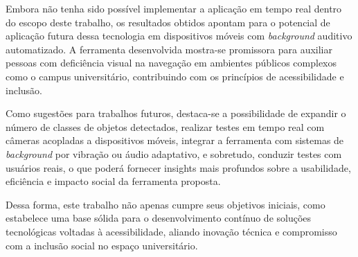 Embora não tenha sido possível implementar a aplicação em tempo real dentro do escopo deste trabalho, os resultados obtidos apontam para o potencial de aplicação futura dessa tecnologia em dispositivos móveis com \textit{background} auditivo automatizado. A ferramenta desenvolvida mostra-se promissora para auxiliar pessoas com deficiência visual na navegação em ambientes públicos complexos como o campus universitário, contribuindo com os princípios de acessibilidade e inclusão.

Como sugestões para trabalhos futuros, destaca-se a possibilidade de expandir o número de classes de objetos detectados, realizar testes em tempo real com câmeras acopladas a dispositivos móveis, integrar a ferramenta com sistemas de \textit{background} por vibração ou áudio adaptativo, e sobretudo, conduzir testes com usuários reais, o que poderá fornecer insights mais profundos sobre a usabilidade, eficiência e impacto social da ferramenta proposta.

Dessa forma, este trabalho não apenas cumpre seus objetivos iniciais, como estabelece uma base sólida para o desenvolvimento contínuo de soluções tecnológicas voltadas à acessibilidade, aliando inovação técnica e compromisso com a inclusão social no espaço universitário.